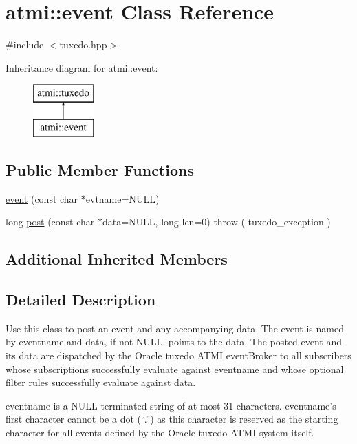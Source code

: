 \hypertarget{classatmi_1_1event}{}\section{atmi\+:\+:event Class Reference}
\label{classatmi_1_1event}


{\ttfamily \#include $<$tuxedo.\+hpp$>$}

Inheritance diagram for atmi\+:\+:event\+:\begin{figure}[H]
\begin{center}
\leavevmode
\includegraphics[height=2.000000cm]{classatmi_1_1event}
\end{center}
\end{figure}
\subsection*{Public Member Functions}
\begin{DoxyCompactItemize}
\item 
\hyperlink{classatmi_1_1event_a64e8905f6b027d052074cb801567b1b3}{event} (const char $\ast$evtname=N\+U\+L\+L)
\item 
long \hyperlink{classatmi_1_1event_a0b1f1faae17aa923ce5a4a0d45cfcd07}{post} (const char $\ast$data=N\+U\+L\+L, long len=0)  throw ( tuxedo\+\_\+exception )
\end{DoxyCompactItemize}
\subsection*{Additional Inherited Members}


\subsection{Detailed Description}
Use this class to post an event and any accompanying data. The event is named by eventname and data, if not N\+U\+L\+L, points to the data. The posted event and its data are dispatched by the Oracle tuxedo A\+T\+M\+I event\+Broker to all subscribers whose subscriptions successfully evaluate against eventname and whose optional filter rules successfully evaluate against data.

eventname is a N\+U\+L\+L-\/terminated string of at most 31 characters. eventname’s first character cannot be a dot (“.\+”) as this character is reserved as the starting character for all events defined by the Oracle tuxedo A\+T\+M\+I system itself.

